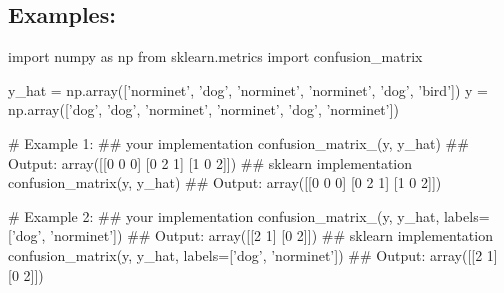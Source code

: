 \documentclass[]{article}
\newenvironment{Shaded}{\begin{snugshade}}{\end{snugshade}}
\newcommand{\CommentTok}[1]{\textcolor[rgb]{0.48,0.49,0.49}{#1}}
\newcommand{\DecValTok}[1]{\textcolor[rgb]{0.96,0.45,0.00}{#1}}
\newcommand{\ImportTok}[1]{\textcolor[rgb]{0.15,0.68,0.38}{#1}}
\newcommand{\NormalTok}[1]{\textcolor[rgb]{0.81,0.81,0.76}{#1}}
\newcommand{\OperatorTok}[1]{\textcolor[rgb]{0.81,0.81,0.76}{#1}}
\newcommand{\StringTok}[1]{\textcolor[rgb]{0.96,0.31,0.31}{#1}}
\begin{document}
\hypertarget{examples-10}{%
\subsection{Examples:}\label{examples-10}}

\begin{Shaded}
\begin{Highlighting}[]
\ImportTok{import}\NormalTok{ numpy }\ImportTok{as}\NormalTok{ np}
\ImportTok{from}\NormalTok{ sklearn.metrics }\ImportTok{import}\NormalTok{ confusion_matrix}

\NormalTok{y_hat }\OperatorTok{=}\NormalTok{ np.array([}\StringTok{'norminet'}\NormalTok{, }\StringTok{'dog'}\NormalTok{, }\StringTok{'norminet'}\NormalTok{, }\StringTok{'norminet'}\NormalTok{, }\StringTok{'dog'}\NormalTok{, }\StringTok{'bird'}\NormalTok{])}
\NormalTok{y }\OperatorTok{=}\NormalTok{ np.array([}\StringTok{'dog'}\NormalTok{, }\StringTok{'dog'}\NormalTok{, }\StringTok{'norminet'}\NormalTok{, }\StringTok{'norminet'}\NormalTok{, }\StringTok{'dog'}\NormalTok{, }\StringTok{'norminet'}\NormalTok{])}

\CommentTok{# Example 1: }
\CommentTok{## your implementation}
\NormalTok{confusion_matrix_(y, y_hat)}
\CommentTok{## Output:}
\NormalTok{array([[}\DecValTok{0} \DecValTok{0} \DecValTok{0}\NormalTok{]}
\NormalTok{       [}\DecValTok{0} \DecValTok{2} \DecValTok{1}\NormalTok{]}
\NormalTok{       [}\DecValTok{1} \DecValTok{0} \DecValTok{2}\NormalTok{]])}
\CommentTok{## sklearn implementation}
\NormalTok{confusion_matrix(y, y_hat)}
\CommentTok{## Output:}
\NormalTok{array([[}\DecValTok{0} \DecValTok{0} \DecValTok{0}\NormalTok{]}
\NormalTok{       [}\DecValTok{0} \DecValTok{2} \DecValTok{1}\NormalTok{]}
\NormalTok{       [}\DecValTok{1} \DecValTok{0} \DecValTok{2}\NormalTok{]])}

\CommentTok{# Example 2:}
\CommentTok{## your implementation}
\NormalTok{confusion_matrix_(y, y_hat, labels}\OperatorTok{=}\NormalTok{[}\StringTok{'dog'}\NormalTok{, }\StringTok{'norminet'}\NormalTok{])}
\CommentTok{## Output:}
\NormalTok{array([[}\DecValTok{2} \DecValTok{1}\NormalTok{]}
\NormalTok{       [}\DecValTok{0} \DecValTok{2}\NormalTok{]])}
\CommentTok{## sklearn implementation}
\NormalTok{confusion_matrix(y, y_hat, labels}\OperatorTok{=}\NormalTok{[}\StringTok{'dog'}\NormalTok{, }\StringTok{'norminet'}\NormalTok{])}
\CommentTok{## Output:}
\NormalTok{array([[}\DecValTok{2} \DecValTok{1}\NormalTok{]}
\NormalTok{       [}\DecValTok{0} \DecValTok{2}\NormalTok{]])}
\end{Highlighting}
\end{Shaded}
\end{document}
